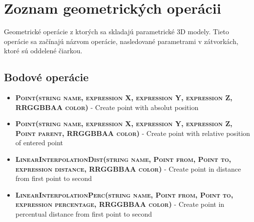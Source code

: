 \chapter{Zoznam geometrických operácii}
\label{Priloha:zoznamGeometrickychOperacii}
Geometrické operácie z ktorých sa skladajú parametrické 3D modely. Tieto operácie sa začínajú názvom operácie, nasledované parametrami v zátvorkách, ktoré sú oddelené čiarkou.

\section*{Bodové operácie}
\begin{itemize}


\item \textsc{\textbf{Point(string name, expression X, expression Y, expression Z, RRGGBBAA color)}} - Create point with absolut position
\item \textsc{\textbf{Point(string name, expression X, expression Y, expression Z, Point parent, RRGGBBAA color)}} - Create point with relative position of entered point

\item \textsc{\textbf{LinearInterpolationDist(string name, Point from, Point to, expression distance, RRGGBBAA color)}} - Create point in distance from first point to second
		 
\item \textsc{\textbf{LinearInterpolationPerc(string name, Point from, Point to, expression percentage, RRGGBBAA color)}} - Create point in percentual distance from first point to second


\end{itemize}
